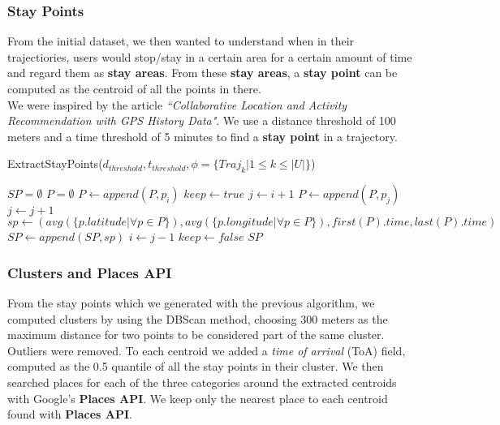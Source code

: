 \documentclass[../../main]{subfiles}
\begin{document}
\subsubsection{Stay Points}
\label{sss:stay-points}
From the initial dataset, we then wanted to understand when in their trajectiories, users would stop/stay in a certain area for a certain amount of time and regard them as \textbf{stay areas}.
From these \textbf{stay areas}, a \textbf{stay point} can be computed as the centroid of all the points in there.\\
We were inspired by the article \textit{``Collaborative Location and Activity Recommendation with GPS History Data"}. 
We use a distance threshold of 100 meters and a time threshold of 5 minutes to find a \textbf{stay point} in a trajectory.
\begin{algorithm}
    \caption{ExtractStayPoints($d_{threshold}, t_{threshold}, \phi{}=\{Traj_k | 1 \le{} k \le{} |U|\}$)}
    \begin{algorithmic}
        \STATE $SP = \emptyset$
                \STATE $P = \emptyset$
                \STATE $P \leftarrow{} append(P, p_i)$
                \STATE $keep \leftarrow{} true$
                \STATE $j \leftarrow{} i + 1$
                        \STATE $P \leftarrow{} append(P, p_j)$
                        \STATE $j \leftarrow{} j + 1$
                    \ELSE
                            \STATE $sp \leftarrow{} (avg(\{p.latitude | \forall{} p \in{} P\}), avg(\{p.longitude | \forall{} p \in{} P\}), first(P).time, last(P).time)$
                            \STATE $SP \leftarrow{} append(SP, sp)$
                            \STATE $i \leftarrow{} j - 1$
                        \ENDIF
                        \STATE $keep \leftarrow{} false$
                    \ENDIF
                \ENDWHILE
            \ENDFOR
        \ENDFOR
        \RETURN $SP$
    \end{algorithmic}
\end{algorithm}

\subsubsection{Clusters and Places API}
\label{sss:cluster}
From the stay points which we generated with the previous algorithm, we computed clusters by using the DBScan method, choosing 300 meters as the maximum distance for two points to be considered part of the same cluster.
Outliers were removed.
To each centroid we added a \textit{time of arrival} (ToA) field, computed as the 0.5 quantile of all the stay points in their cluster.
We then searched places for each of the three categories around the extracted centroids with Google's \textbf{Places API}.
We keep only the nearest place to each centroid found with \textbf{Places API}.
\end{document}
